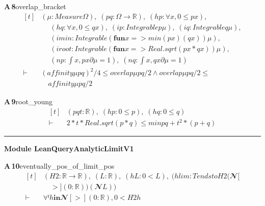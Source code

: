 \documentclass[conference]{IEEEtran}
\theoremstyle{definition}
\newcommand{\lean}[1]{\textsf{\footnotesize #1}}
\begin{document}
\noindent\textbf{A\,8}\quad\lean{overlap\_bracket}
{\footnotesize\[ \begin{aligned}[t]
&(\mu : \mathit{Measure} \Omega ),\; (\mathit{p} \mathit{q} : \Omega \to \mathbb{R} ),\; (\mathit{hp} : \forall \mathit{x}, 0 \leq \mathit{p} \mathit{x}),\\
&\quad \; (\mathit{hq} : \forall \mathit{x}, 0 \leq \mathit{q} \mathit{x}),\; (\mathit{ip} : \mathit{Integrable} \mathit{p} \mu ),\; (\mathit{iq} : \mathit{Integrable} \mathit{q} \mu ),\\
&\quad \; (\mathit{imin} : \mathit{Integrable} (\mathbf{fun} \mathit{x} => \mathit{min} (\mathit{p} \mathit{x}) (\mathit{q} \mathit{x})) \mu ),\\
&\quad \; (\mathit{iroot} : \mathit{Integrable} (\mathbf{fun} \mathit{x} => \mathit{Real}.\mathit{sqrt} (\mathit{p} \mathit{x}*\mathit{q} \mathit{x})) \mu ),\\
&\quad \; (\mathit{np} : \int \mathit{x}, \mathit{p} \mathit{x} ∂\mu = 1),\; (\mathit{nq} : \int \mathit{x}, \mathit{q} \mathit{x} ∂\mu = 1)\\
\vdash\;&(\mathit{affinity} \mu \mathit{p} \mathit{q})^{2}/4 \leq \mathit{overlap} \mu \mathit{p} \mathit{q}/2 \wedge \mathit{overlap} \mu \mathit{p} \mathit{q}/2 \leq\\
&\quad \mathit{affinity} \mu \mathit{p} \mathit{q}/2
\end{aligned} \]}

\noindent\textbf{A\,9}\quad\lean{root\_young}
{\footnotesize\[ \begin{aligned}[t]
&(\mathit{p} \mathit{q} \mathit{t} : \mathbb{R} ),\; (\mathit{hp} : 0 \leq \mathit{p}),\; (\mathit{hq} : 0 \leq \mathit{q})\\
\vdash\;&2*\mathit{t}*\mathit{Real}.\mathit{sqrt} (\mathit{p}*\mathit{q}) \leq \mathit{min} \mathit{p} \mathit{q} + \mathit{t}^{2}*(\mathit{p}+\mathit{q})
\end{aligned} \]}

\vspace{4pt}\noindent\rule{\columnwidth}{0.4pt}\par\vspace{2pt}
\noindent\textbf{Module \lean{LeanQueryAnalyticLimitV1}}\par\vspace{3pt}

\noindent\textbf{A\,10}\quad\lean{eventually\_pos\_of\_limit\_pos}
{\footnotesize\[ \begin{aligned}[t]
&(\mathit{H2} : \mathbb{R} \to \mathbb{R} ),\; (\mathit{L} : \mathbb{R} ),\; (\mathit{hL} : 0 < \mathit{L}),\; (\mathit{hlim} : \mathit{Tendsto} \mathit{H2} (𝓝[\\
&\quad >] (0:\mathbb{R} )) (𝓝 \mathit{L}))\\
\vdash\;&\forall  ᶠ \mathit{h} \mathbf{in} 𝓝[>] (0:\mathbb{R} ), 0 < \mathit{H2} \mathit{h}
\end{aligned} \]}
\end{document}
